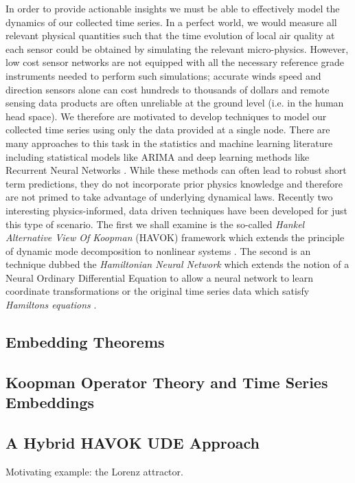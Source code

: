 In order to provide actionable insights we must be able to effectively model the dynamics of our collected time series. In a perfect world, we would measure all relevant physical quantities such that the time evolution of local air quality at each sensor could be obtained by simulating the relevant micro-physics. However, low cost sensor networks are not equipped with all the necessary reference grade instruments needed to perform such simulations; accurate winds speed and direction sensors alone can cost hundreds to thousands of dollars and remote sensing data products are often unreliable at the ground level (i.e. in the human head space). We therefore are motivated to develop techniques to model our collected time series using only the data provided at a single node. There are many approaches to this task in the statistics and machine learning literature including statistical models like ARIMA and deep learning methods like Recurrent Neural Networks \cite{intro-to-time-series-models, time-series-rnns}. While these methods can often lead to robust short term predictions, they do not incorporate prior physics knowledge and therefore are not primed to take advantage of underlying dynamical laws. Recently two interesting physics-informed, data driven techniques have been developed for just this type of scenario. The first we shall examine is the so-called \textit{Hankel Alternative View Of Koopman} (HAVOK) framework which extends the principle of dynamic mode decomposition to nonlinear systems \cite{brunton-havok}. The second is an technique dubbed the \textit{Hamiltonian Neural Network} which extends the notion of a Neural Ordinary Differential Equation to allow a neural network to learn coordinate transformations or the original time series data which satisfy \textit{Hamiltons equations} \cite{greydanus-hnn}.

\subsection{Embedding Theorems}
\subsection{Koopman Operator Theory and Time Series Embeddings}
\subsection{A Hybrid HAVOK UDE Approach}


Motivating example: the Lorenz attractor.

